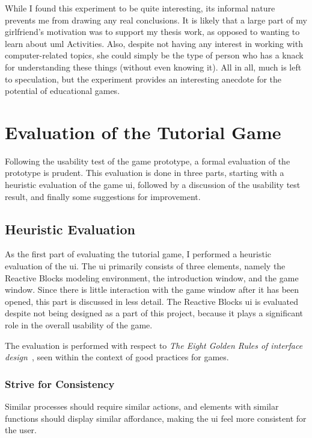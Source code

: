 \noindent
While I found this experiment to be quite interesting, its informal nature prevents me from drawing any real conclusions. It is likely that a large part of my girlfriend's motivation was to support my thesis work, as opposed to wanting to learn about \gls{uml} Activities. Also, despite not having any interest in working with computer-related topics, she could simply be the type of person who has a knack for understanding these things (without even knowing it). All in all, much is left to speculation, but the experiment provides an interesting anecdote for the potential of educational games.

\section{Evaluation of the Tutorial Game}
\label{sec:game_evaluation}
Following the usability test of the game prototype, a formal evaluation of the prototype is prudent. This evaluation is done in three parts, starting with a heuristic evaluation of the game \gls{ui}, followed by a discussion of the usability test result, and finally some suggestions for improvement.

\subsection{Heuristic Evaluation}
\label{sec:game_heuristic_evaluation}
As the first part of evaluating the tutorial game, I performed a heuristic evaluation of the \gls{ui}. The \gls{ui} primarily consists of three elements, namely the Reactive Blocks modeling environment, the introduction window, and the game window. Since there is little interaction with the game window after it has been opened, this part is discussed in less detail. The Reactive Blocks \gls{ui} is evaluated despite not being designed as a part of this project, because it plays a significant role in the overall usability of the game.

\noindent
The evaluation is performed with respect to \emph{The Eight Golden Rules of interface design}~\cite{shneiderman:user_interface}, seen within the context of good practices for games.

\subsubsection{Strive for Consistency}
Similar processes should require similar actions, and elements with similar functions should display similar affordance, making the \gls{ui} feel more consistent for the user.

